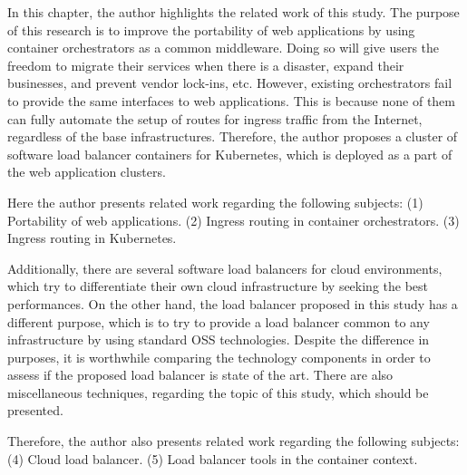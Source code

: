 
In this chapter, the author highlights the related work of this study.
The purpose of this research is to improve the portability of web applications by using container orchestrators as a common middleware.
Doing so will give users the freedom to migrate their services when there is a disaster, expand their businesses, and prevent vendor lock-ins, etc.
However, existing orchestrators fail to provide the same interfaces to web applications.
This is because none of them can fully automate the setup of routes for ingress traffic from the Internet, regardless of the base infrastructures.
Therefore, the author proposes a cluster of software load balancer containers for Kubernetes, which is deployed as a part of the web application clusters.

Here the author presents related work regarding the following subjects:
(1) Portability of web applications.
(2) Ingress routing in container orchestrators.
(3) Ingress routing in Kubernetes.

Additionally, there are several software load balancers for cloud environments, which try to differentiate their own cloud infrastructure by seeking the best performances.
On the other hand, the load balancer proposed in this study has a different purpose, which is to try to provide a load balancer common to any infrastructure by using standard OSS technologies.
Despite the difference in purposes, it is worthwhile comparing the technology components in order to assess if the proposed load balancer is state of the art.
There are also miscellaneous techniques, regarding the topic of this study, which should be presented.

Therefore, the author also presents related work regarding the following subjects:
(4) Cloud load balancer.
(5) Load balancer tools in the container context.




